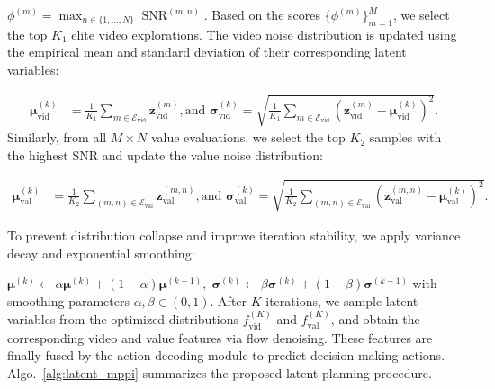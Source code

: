 $
\scriptstyle
\phi^{(m)} = \max_{n \in \{1,\dots,N\}} \operatorname{SNR}^{(m,n)}$.
Based on the scores $\{\phi^{(m)}\}_{m=1}^M$, we select the top $K_1$ elite video explorations.
The video noise distribution is updated using the empirical mean and standard deviation of their corresponding latent variables:

{
\scriptsize
\begin{equation}
\begin{aligned}
\boldsymbol{\mu}_{\mathrm{vid}}^{(k)}
&=
\frac{1}{K_1}
\sum_{m \in \mathcal{E}_{\mathrm{vid}}}
\mathbf{z}_{\mathrm{vid}}^{(m)}, \text{and }
\boldsymbol{\sigma}_{\mathrm{vid}}^{(k)}
=
\sqrt{
\frac{1}{K_1}
\sum_{m \in \mathcal{E}_{\mathrm{vid}}}
\left(
\mathbf{z}_{\mathrm{vid}}^{(m)} -
\boldsymbol{\mu}_{\mathrm{vid}}^{(k)}
\right)^2
}.
\end{aligned}
\label{eq:video_mu_sigma}
\end{equation}
}
Similarly, from all $M \times N$ value evaluations, we select the top $K_2$ samples with the highest SNR and update the value noise distribution:

{\scriptsize
\begin{equation}
\begin{aligned}
\boldsymbol{\mu}_{\mathrm{val}}^{(k)}
&=
\frac{1}{K_2}
\sum_{(m,n) \in \mathcal{E}_{\mathrm{val}}}
\mathbf{z}_{\mathrm{val}}^{(m,n)},
 \text{and }
\boldsymbol{\sigma}_{\mathrm{val}}^{(k)}
=
\sqrt{
\frac{1}{K_2}
\sum_{(m,n) \in \mathcal{E}_{\mathrm{val}}}
\left(
\mathbf{z}_{\mathrm{val}}^{(m,n)} -
\boldsymbol{\mu}_{\mathrm{val}}^{(k)}
\right)^2
}.
\end{aligned}
\label{eq:value_mu_sigma}
\end{equation}
}

To prevent distribution collapse and improve iteration stability, we apply variance decay and exponential smoothing:

\(
\scriptstyle
\boldsymbol{\mu}^{(k)} \!\leftarrow\!
\alpha \boldsymbol{\mu}^{(k)} + (1-\alpha)\boldsymbol{\mu}^{(k-1)},\;
\boldsymbol{\sigma}^{(k)} \!\leftarrow\!
\beta \boldsymbol{\sigma}^{(k)} + (1-\beta)\boldsymbol{\sigma}^{(k-1)}
\)
with smoothing parameters $\alpha, \beta \in (0,1)$.
After $K$ iterations, we sample latent variables from the optimized distributions
$f_{\mathrm{vid}}^{(K)}$ and $f_{\mathrm{val}}^{(K)}$,
and obtain the corresponding video and value features via flow denoising.
These features are finally fused by the action decoding module to predict decision-making actions.
Algo.~\ref{alg:latent_mppi} summarizes the proposed latent planning procedure.

